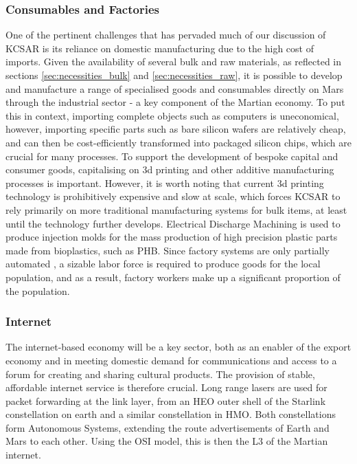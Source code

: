 \documentclass[fleqn,10pt]{Stylesheet} %
\begin{document}
\subsubsection{Consumables and Factories}
\label{sec:necessities_consumable}

One of the pertinent challenges that has pervaded much of our discussion of KCSAR is its reliance on domestic manufacturing due to the high cost of imports. Given the availability of several bulk and raw materials, as reflected in sections \ref{sec:necessities_bulk} and \ref{sec:necessities_raw}, it is possible to develop and manufacture a range of specialised goods and consumables directly on Mars through the industrial sector - a key component of the Martian economy. To put this in context, importing complete objects such as computers is uneconomical, however, importing specific parts such as bare silicon wafers are relatively cheap, and can then be cost-efficiently transformed into packaged silicon chips, which are crucial for many processes. To support the development of bespoke capital and consumer goods, capitalising on 3d printing and other additive manufacturing processes is important. However, it is worth noting that current 3d printing technology is prohibitively expensive and slow at scale, which forces KCSAR to rely primarily on more traditional manufacturing systems for bulk items, at least until the technology further develops. Electrical Discharge Machining is used to produce injection molds for the mass production of high precision plastic parts made from bioplastics, such as PHB. Since factory systems are only partially automated \cite{Huang2017}, a sizable labor force is required to produce goods for the local population, and as a result, factory workers make up a significant proportion of the population.

\subsubsection{Internet}
\label{sec:necessities_internet}
The internet-based economy will be a key sector, both as an enabler of the export economy and in meeting domestic demand for communications and access to a forum for creating and sharing cultural products. The provision of stable, affordable internet service is therefore crucial. Long range lasers are used for packet forwarding at the link layer, from an HEO outer shell of the Starlink constellation on earth and a similar constellation in HMO. Both constellations form Autonomous Systems, extending the route advertisements of Earth and Mars to each other. Using the OSI model, this is then the L3 of the Martian internet.
\end{document}
